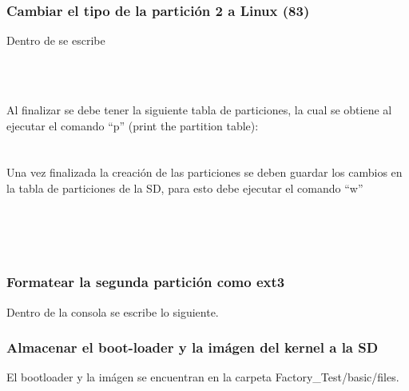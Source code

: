 \documentclass[12pt]{article}
\begin{document}
\subsubsection{Cambiar el tipo de la partición 2 a Linux (83)}
\noindent
Dentro de  se escribe
\begin{center}
 \\
 \\
\end{center}
\noindent
Al finalizar se debe tener la siguiente tabla de particiones, la cual se obtiene al ejecutar el comando ``p'' (print the partition table):\\
\\
\\
\noindent
Una vez finalizada la creación de las particiones se deben guardar los cambios en la tabla de particiones de la SD, para esto debe ejecutar el comando ``w''
\begin{center}
 \\
 \\
 \\
\end{center}

\subsubsection{Formatear la segunda partición como ext3}
\noindent
Dentro de la consola se escribe lo siguiente.
\begin{center}
\end{center}

\subsubsection{Almacenar el boot-loader y la imágen del kernel a la SD}
\noindent
El bootloader y la imágen se encuentran en la carpeta Factory\_Test/basic/files.
\begin{center}
 \\
\end{center}
\end{document}
